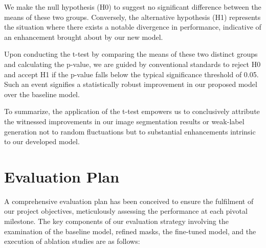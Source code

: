 We make the null hypothesis (H0) to suggest no significant difference between the means of these two groups. Conversely, the alternative hypothesis (H1) represents the situation where there exists a notable divergence in performance, indicative of an enhancement brought about by our new model.

Upon conducting the t-test by comparing the means of these two distinct groups and calculating the p-value, we are guided by conventional standards to reject H0 and accept H1 if the p-value falls below the typical significance threshold of 0.05. Such an event signifies a statistically robust improvement in our proposed model over the baseline model.

To summarize, the application of the t-test empowers us to conclusively attribute the witnessed improvements in our image segmentation results or weak-label generation not to random fluctuations but to substantial enhancements intrinsic to our developed model.

\section{Evaluation Plan}
A comprehensive evaluation plan has been conceived to ensure the fulfilment of our project objectives, meticulously assessing the performance at each pivotal milestone. The key components of our evaluation strategy involving the examination of the baseline model, refined masks, the fine-tuned model, and the execution of ablation studies are as follows:

